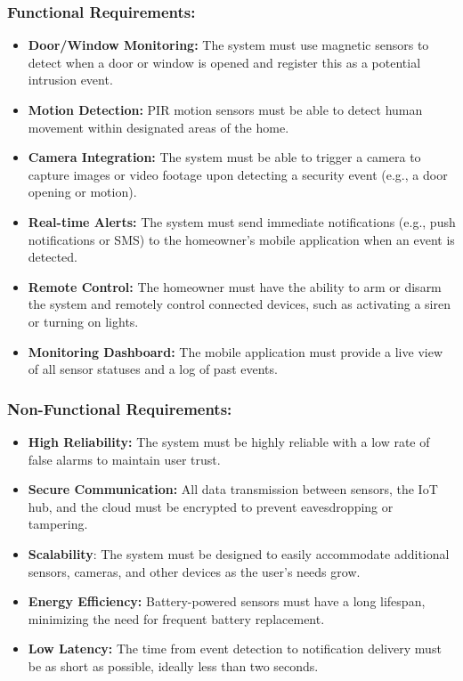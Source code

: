 \documentclass[conference]{IEEEtran}
\begin{document}
\subsubsection{\textbf{Functional Requirements:}}
\begin{itemize}
    \item \textbf{Door/Window Monitoring:} The system must use magnetic sensors to detect when a door or window is opened and register this as a potential intrusion event.
    \item \textbf{Motion Detection:} PIR motion sensors must be able to detect human movement within designated areas of the home.
    \item \textbf{Camera Integration:} The system must be able to trigger a camera to capture images or video footage upon detecting a security event (e.g., a door opening or motion).
    \item \textbf{Real-time Alerts:} The system must send immediate notifications (e.g., push notifications or SMS) to the homeowner's mobile application when an event is detected.
    \item \textbf{Remote Control:} The homeowner must have the ability to arm or disarm the system and remotely control connected devices, such as activating a siren or turning on lights.
    \item \textbf{Monitoring Dashboard:} The mobile application must provide a live view of all sensor statuses and a log of past events.
\end{itemize}
\subsubsection{Non-Functional Requirements:}
\begin{itemize}
    \item \textbf{High Reliability:} The system must be highly reliable with a low rate of false alarms to maintain user trust.
    \item \textbf{Secure Communication:} All data transmission between sensors, the IoT hub, and the cloud must be encrypted to prevent eavesdropping or tampering.
    \item \textbf{Scalability}: The system must be designed to easily accommodate additional sensors, cameras, and other devices as the user’s needs grow.
    \item \textbf{Energy Efficiency:} Battery-powered sensors must have a long lifespan, minimizing the need for frequent battery replacement.
    \item \textbf{Low Latency:} The time from event detection to notification delivery must be as short as possible, ideally less than two seconds.
\end{itemize}
\end{document}
